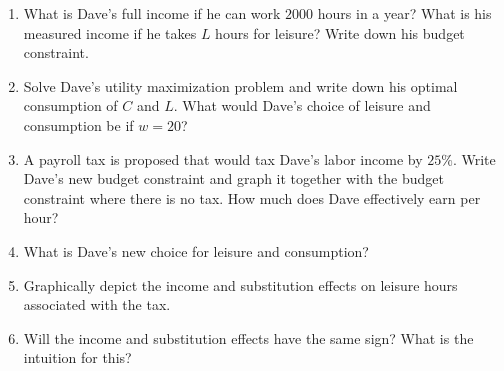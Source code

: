 \documentclass[12pt,a4paper]{article}
\begin{document}
\begin{enumerate}[label=\alph*.]
    \item What is Dave's full income if he can work \(2000\) hours in a year? What is his measured income if he takes \(L\) hours for leisure? Write down his budget constraint.

    \item Solve Dave's utility maximization problem and write down his optimal consumption of \(C\) and \(L\). What would Dave's choice of leisure and consumption be if \(w=20\)?

    \item A payroll tax is proposed that would tax Dave's labor income by \(25\%\). Write Dave's new budget constraint and graph it together with the budget constraint where there is no tax. How much does Dave effectively earn per hour?

    \item What is Dave's new choice for leisure and consumption?

    \item Graphically depict the income and substitution effects on leisure hours associated with the tax.

    \item Will the income and substitution effects have the same sign? What is the intuition for this?
\end{enumerate}

\vspace{0.5cm}
\end{document}

